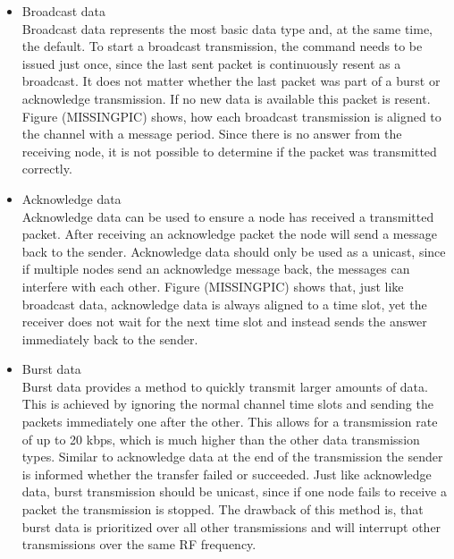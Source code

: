 \begin{itemize}
	\item{Broadcast data} \hfill \\ Broadcast data represents the most basic data type and, at the same time, the default. To start a broadcast transmission, the command needs to be issued just once, since the last sent packet is continuously resent as a broadcast. It does not matter whether the last packet was part of a burst or acknowledge transmission. If no new data is available this packet is resent. Figure (MISSINGPIC) shows, how each broadcast transmission is aligned to the channel with a message period. Since there is no answer from the receiving node, it is not possible to determine if the packet was transmitted correctly.
	
	\item{Acknowledge data} \hfill \\ Acknowledge data can be used to ensure a node has received a transmitted packet. After receiving an acknowledge packet the node will send a message back to the sender. Acknowledge data should only be used as a unicast, since if multiple nodes send an acknowledge message back, the messages can interfere with each other. Figure (MISSINGPIC) shows that, just like broadcast data, acknowledge data is always aligned to a time slot, yet the receiver does not wait for the next time slot and instead sends the answer immediately back to the sender.
	
	\item{Burst data} \hfill \\ Burst data provides a method to quickly transmit larger amounts of data. This is achieved by ignoring the normal channel time slots and sending the packets immediately one after the other. This allows for a transmission rate of up to 20 kbps, which is much higher than the other data transmission types. Similar to acknowledge data at the end of the transmission the sender is informed whether the transfer failed or succeeded. Just like acknowledge data, burst transmission should be unicast, since if one node fails to receive a packet the transmission is stopped. The drawback of this method is, that burst data is prioritized over all other transmissions and will interrupt other transmissions over the same RF frequency.
\end{itemize}

